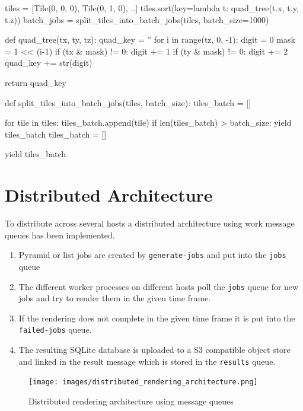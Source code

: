 \begin{pythoncode}
tiles = [Tile(0, 0, 0), Tile(0, 1, 0), ..]
tiles.sort(key=lambda t: quad_tree(t.x, t.y, t.z))
batch_jobs = split_tiles_into_batch_jobs(tiles, batch_size=1000)

def quad_tree(tx, ty, tz):
    quad_key = ''
    for i in range(tz, 0, -1):
        digit = 0
        mask = 1 << (i-1)
        if (tx & mask) != 0:
            digit += 1
        if (ty & mask) != 0:
            digit += 2
        quad_key  += str(digit)

    return quad_key
    
def split_tiles_into_batch_jobs(tiles, batch_size):
    tiles_batch = []
    
    for tile in tiles:
        tiles_batch.append(tile)
        if len(tiles_batch) > batch_size:
            yield tiles_batch
            tiles_batch = []

    yield tiles_batch
\end{pythoncode}

\newpage
\section{Distributed Architecture}

To distribute across several hosts a distributed architecture using work message queues has been implemented.

\begin{enumerate}  
    \item Pyramid or list jobs are created by \texttt{generate-jobs} and put into the \texttt{jobs} queue
    \item The different worker processes on different hosts poll the \texttt{jobs} queue for new jobs and try to render them in the given time frame.
    \item If the rendering does not complete in the given time frame it is put into the \texttt{failed-jobs} queue.
    \item The resulting SQLite database is uploaded to a S3 compatible object store and linked in the result message which is stored in the \texttt{results} queue.
\end{enumerate}


\begin{figure}[H]
  \centering
  \texttt{[image: images/distributed\_rendering\_architecture.png]}
  \caption{Distributed rendering architecture using message queues}
\end{figure}

